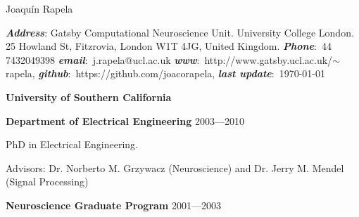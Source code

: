 \documentclass{article}
\begin{document}
\reversemarginpar		%

{\huge{Joaqu\'{i}n Rapela}}	%

\renewcommand{\labelitemi}{$\star$}
\textit{\textbf{Address}}: Gatsby Computational Neuroscience Unit. University
College London. 25 Howland St, Fitzrovia, London W1T 4JG, United Kingdom.
\textit{\textbf{Phone}}:~44 7432049398
\textit{\textbf{email}}:~j.rapela@ucl.ac.uk
\textit{\textbf{www}}:~http://www.gatsby.ucl.ac.uk/$\sim$rapela,
\textit{\textbf{github}}:~https://github.com/joacorapela,
\textit{\textbf{last update}}:~\today

\par
\vspace{2\baselineskip}
{\bf University of Southern California} 

\par
\vspace{.05in}
{\bf Department of Electrical Engineering} \hspace*{\fill} 2003---2010
\par

\par
PhD in Electrical Engineering.
\par
Advisors: Dr. Norberto M. Grzywacz (Neuroscience) and Dr. Jerry M. Mendel (Signal Processing)
\par
\vspace{.05in}
{\bf Neuroscience Graduate Program} \hspace*{\fill} 2001---2003
\par
\end{document}
